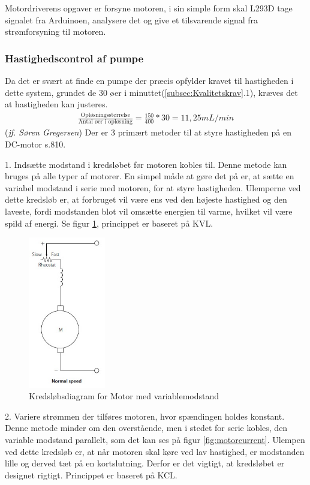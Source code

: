 Motordriverens opgaver er forsyne motoren, i sin simple form skal L293D tage signalet fra Arduinoen, analysere det og give et tilsvarende signal fra strømforsyning til motoren.
\subsubsection{Hastighedscontrol af pumpe}
Da det er svært at finde en pumpe der præcis opfylder kravet til hastigheden i dette system, grundet de 30 øer i minuttet(\ref{subsec:Kvalitetskrav}.1), kræves det at hastigheden kan justeres.
\begin{align}
\frac{\text{Opløsningsstørrelse}}{\text{Antal øer i opløsning}} = \frac{150}{400}*30 = 11,25mL/min
\label{eg:ohastighed}
\end{align}(\textit{jf. Søren Gregersen})
Der er 3 primært metoder til at styre hastigheden på en DC-motor \citep{ELengbog}s.810.

1. Indsætte modstand i kredsløbet før motoren kobles til.
Denne metode kan bruges på alle typer af motorer. En simpel måde at gøre det på er, at sætte en variabel modstand i serie med motoren, for at styre hastigheden. Ulemperne ved dette kredsløb er, at forbruget vil være ens ved den højeste hastighed og den laveste, fordi modstanden blot vil omsætte energien til varme, hvilket vil være spild af energi. Se figur \ref{fig:motormodstand}, princippet er baseret på KVL.

\begin{figure}[H]
	\centering
	\includegraphics[width=0.3\textwidth]{billeder/Hardware/motormodstand.jpg}
	\caption{Kredsløbsdiagram for Motor med variablemodstand}
	\label{fig:motormodstand}
\end{figure}

2. Variere strømmen der tilføres motoren, hvor spændingen holdes konstant.
Denne metode minder om den overstående, men i stedet for serie kobles, den variable modstand parallelt, som det kan ses på figur \ref{fig:motorcurrent}. Ulempen ved dette kredsløb er, at når motoren skal køre ved lav hastighed, er modstanden lille og derved tæt på en kortslutning. Derfor er det vigtigt, at kredsløbet er designet rigtigt. Princippet er baseret på KCL.

